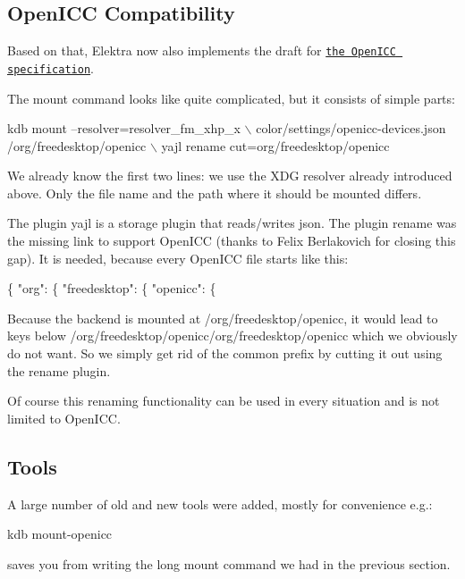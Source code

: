 \subsection*{Open\+I\+CC Compatibility}

Based on that, Elektra now also implements the draft for \href{https://www.openicc.info/index.php%3Ftitle=OpenICC_Configuration_0.1.html}{\tt the Open\+I\+CC specification}.

The mount command looks like quite complicated, but it consists of simple parts\+:


\begin{DoxyCode}
kdb mount --resolver=resolver\_fm\_xhp\_x \(\backslash\)
  color/settings/openicc-devices.json /org/freedesktop/openicc \(\backslash\)
  yajl rename cut=org/freedesktop/openicc
\end{DoxyCode}


We already know the first two lines\+: we use the X\+DG resolver already introduced above. Only the file name and the path where it should be mounted differs.

The plugin yajl is a storage plugin that reads/writes json. The plugin rename was the missing link to support Open\+I\+CC (thanks to Felix Berlakovich for closing this gap). It is needed, because every Open\+I\+CC file starts like this\+:


\begin{DoxyCode}
\{ "org": \{ "freedesktop": \{ "openicc": \{
\end{DoxyCode}


Because the backend is mounted at /org/freedesktop/openicc, it would lead to keys below /org/freedesktop/openicc/org/freedesktop/openicc which we obviously do not want. So we simply get rid of the common prefix by cutting it out using the rename plugin.

Of course this renaming functionality can be used in every situation and is not limited to Open\+I\+CC.

\subsection*{Tools}

A large number of old and new tools were added, mostly for convenience e.\+g.\+:


\begin{DoxyCode}
kdb mount-openicc
\end{DoxyCode}


saves you from writing the long mount command we had in the previous section.

